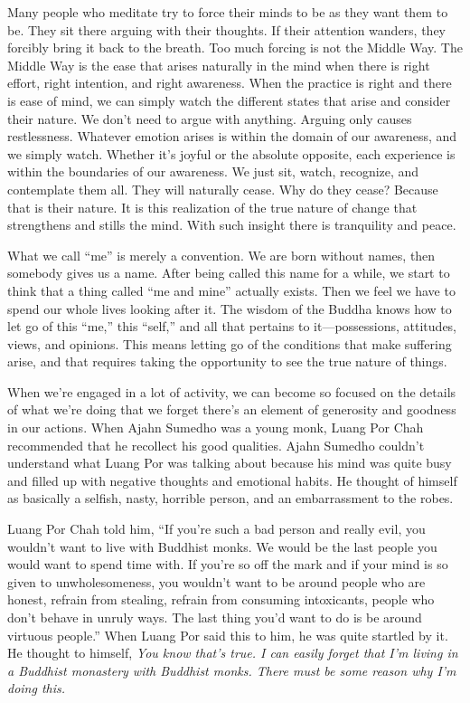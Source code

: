 Many people who meditate try to force their minds to be as they want 
them to be. They sit there arguing with their thoughts. If their 
attention wanders, they forcibly bring it back to the breath. Too much 
forcing is not the Middle Way. The Middle Way is the ease that arises 
naturally in the mind when there is right effort, right intention, and 
right awareness. When the practice is right and there is ease of mind, 
we can simply watch the different states that arise and consider their 
nature. We don't need to argue with anything. Arguing only causes 
restlessness. Whatever emotion arises is within the domain of our 
awareness, and we simply watch. Whether it's joyful or the absolute 
opposite, each experience is within the boundaries of our awareness. We 
just sit, watch, recognize, and contemplate them all. They will 
naturally cease. Why do they cease? Because that is their nature. It is 
this realization of the true nature of change that strengthens and 
stills the mind. With such insight there is tranquility and peace.

What we call ``me'' is merely a convention. We are born without names, 
then somebody gives us a name. After being called this name for a 
while, we start to think that a thing called ``me and mine'' actually 
exists. Then we feel we have to spend our whole lives looking after it. 
The wisdom of the Buddha knows how to let go of this ``me,'' this 
``self,'' and all that pertains to it---possessions, attitudes, views, 
and opinions. This means letting go of the conditions that make 
suffering arise, and that requires taking the opportunity to see the 
true nature of things.


When we're engaged in a lot of activity, we can become so focused on 
the details of what we're doing that we forget there's an element of 
generosity and goodness in our actions. When Ajahn Sumedho was a young 
monk, Luang Por Chah recommended that he recollect his good qualities. 
Ajahn Sumedho couldn't understand what Luang Por was talking about 
because his mind was quite busy and filled up with negative thoughts 
and emotional habits. He thought of himself as basically a selfish, 
nasty, horrible person, and an embarrassment to the robes.

Luang Por Chah told him, ``If you're such a bad person and really evil, 
you wouldn't want to live with Buddhist monks. We would be the last 
people you would want to spend time with. If you're so off the mark and 
if your mind is so given to unwholesomeness, you wouldn't want to be 
around people who are honest, refrain from stealing, refrain from 
consuming intoxicants, people who don't behave in unruly ways. The last 
thing you'd want to do is be around virtuous people.'' When Luang Por 
said this to him, he was quite startled by it. He thought to himself, 
\emph{You know that's true. I can easily forget that I'm living in a 
Buddhist monastery with Buddhist monks. There must be some reason why 
I'm doing this.}

